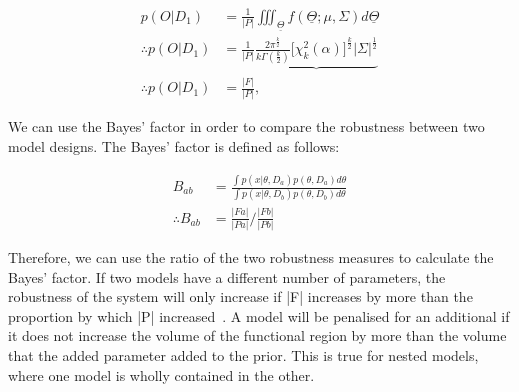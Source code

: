 \begin{align}
p(O|D_1) &= \frac{1}{|P|}\iiint_{\underline{\Theta}}f(\underline{\Theta};\mu,\Sigma)d\underline{\Theta} \\%
\therefore p(O|D_1) &= \frac{1}{|P|}\underbrace{\frac{2\pi^{\frac{k}{2}}}{k\Gamma(\frac{k}{2})} \Big[ \chi _{k}^{2}(\alpha) \Big]^{\frac{k}{2}} |\Sigma|^\frac{1}{2}} \\
\therefore p(O|D_1) &= \frac{|F|}{|P|},
\end{align}



We can use the Bayes' factor in order to compare the robustness between two model designs. The Bayes' factor is defined as follows:

\begin{align}
B_{ab} &= \frac{\displaystyle \int p(x|\theta, D_a)p(\theta, D_a)d\theta}{\displaystyle \int p(x|\theta, D_b)p(\theta, D_b)d\theta} \\
\therefore B_{ab} &= \frac{|Fa|}{|Pa|} / \frac{|Fb|}{|Pb|} \label{eq:final_bayes}
\end{align}

\noindent Therefore, we can use the ratio of the two robustness measures to calculate the Bayes' factor. If two models have a different number of parameters, the robustness of the system will only increase if |F| increases by more than the proportion by which |P| increased~\autocite{Woods:2016eh}. A model will be penalised for an additional if it does not increase the volume of the functional region by more than the volume that the added parameter added to the prior. This is true for nested models, where one model is wholly contained in the other. 

